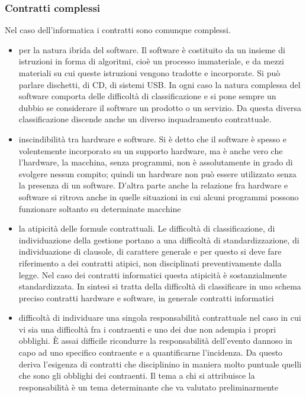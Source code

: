 \subsubsection{Contratti complessi}
 Nel caso dell'informatica i contratti sono comunque complessi.
 
\begin{itemize}
    \item per la natura ibrida del software. Il software è costituito da un insieme di istruzioni in forma di algoritmi, cioè un processo immateriale, e da mezzi materiali su cui queste istruzioni vengono tradotte e incorporate. Si può parlare dischetti, di CD, di sistemi USB. In ogni caso la natura complessa del software comporta delle difficoltà di classificazione e si pone sempre un dubbio se considerare il software un prodotto o un servizio. Da questa diversa classificazione discende anche un diverso inquadramento contrattuale.
    \item  inscindibilità tra hardware e software. Si è detto che il software è spesso e volentemente incorporato su un supporto hardware, ma è anche vero che l'hardware, la macchina, senza programmi, non è assolutamente in grado di svolgere nessun compito; quindi un hardware non può essere utilizzato senza la presenza di un software. D'altra parte anche la relazione fra hardware e software si ritrova anche in quelle situazioni in cui alcuni programmi possono funzionare soltanto su determinate macchine
    \item la atipicità delle formule contrattuali. Le difficoltà di classificazione, di individuazione della gestione portano a una difficoltà di standardizzazione, di individuazione di clausole, di carattere generale e per questo si deve fare riferimento a dei contratti atipici, non disciplinati preventivamente dalla legge. Nel caso dei contratti informatici questa atipicità è sostanzialmente standardizzata. In sintesi si tratta della difficoltà di classificare in uno schema preciso contratti hardware e software, in generale contratti informatici
    \item  difficoltà di individuare una singola responsabilità contrattuale nel caso in cui vi sia una difficoltà fra i contraenti e uno dei due non adempia i propri obblighi. È assai difficile ricondurre la responsabilità dell'evento dannoso in capo ad uno specifico contraente e a quantificarne l'incidenza. Da questo deriva l'esigenza di contratti che disciplinino in maniera molto puntuale quelli che sono gli obblighi dei contraenti. Il tema a chi si attribuisce la responsabilità è un tema determinante che va valutato preliminarmente
\end{itemize}
 
